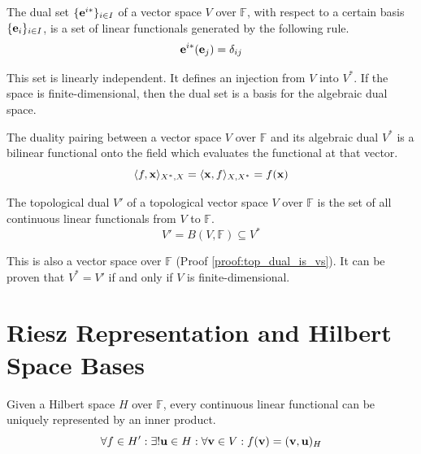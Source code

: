 \begin{definition}
	The dual set $\{ \vb{e}^{i*} \}_{i \in I}$ of a vector space $V$ over $\mathbb{F}$, with respect to a certain basis $\{ \vb{e}_{i} \}_{i \in I}$, is a set of linear functionals generated by the following rule.
	\begin{equation*}
		\vb{e}^{i*}(\vb{e}_{j}) = \delta_{ij}
	\end{equation*}
\end{definition}

This set is linearly independent. It defines an injection from $V$ into $V^{*}$. If the space is finite-dimensional, then the dual set is a basis for the algebraic dual space.

\begin{definition}
	The duality pairing between a vector space $V$ over $\mathbb{F}$ and its algebraic dual $V^{*}$ is a bilinear functional onto the field which evaluates the functional at that vector.
	\begin{equation}
		\langle f, \vb{x} \rangle_{X^{*}, X} = \langle \vb{x}, f \rangle_{X, X^{*}} = f(\vb{x})
	\end{equation}
\end{definition}

\begin{definition}
The topological dual $V'$ of a topological vector space $V$ over $\mathbb{F}$ is the set of all continuous linear functionals from $V$ to $\mathbb{F}$.
\begin{equation}
	V' = B(V, \mathbb{F}) \subseteq V^{*}
\end{equation}
\end{definition}

This is also a vector space over $\mathbb{F}$ (Proof \ref{proof:top_dual_is_vs}). It can be proven that $V^{*} = V'$ if and only if $V$ is finite-dimensional.

\section{Riesz Representation and Hilbert Space Bases}

\begin{theorem}
	Given a Hilbert space $H$ over $\mathbb{F}$, every continuous linear functional can be uniquely represented by an inner product.
	\begin{equation}
		\forall f \in H': \exists! \vb{u} \in H: \forall \vb{v} \in V: f(\vb{v}) = (\vb{v}, \vb{u})_{H}
	\end{equation}
\end{theorem}


